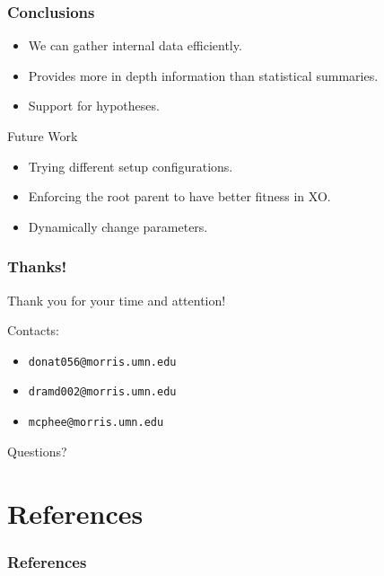 \documentclass{beamer}
\newcommand{\linespace}{\vskip 0.25cm}
\begin{document}
\begin{frame}
\frametitle{Conclusions}

\begin{itemize}
\item We can gather internal data efficiently.
\item Provides more in depth information than statistical summaries. 
\item Support for hypotheses.
\end{itemize}
\linespace
\linespace
\linespace
\linespace

Future Work
\begin{itemize}
\item Trying different setup configurations.
\item Enforcing the root parent to have better fitness in XO.
\item Dynamically change parameters.
\end{itemize}
\end{frame}

\begin{frame}
	\frametitle{Thanks!}
	
	Thank you for your time and attention!
		
	\linespace
	\linespace
	
	Contacts:  
	\begin{itemize}
		\item \texttt{donat056@morris.umn.edu}
		\item \texttt{dramd002@morris.umn.edu}
		\item \texttt{mcphee@morris.umn.edu}
	\end{itemize}
	
	\linespace
	\linespace
	
	\begin{center}
	{\huge Questions?}
	\end{center}
\end{frame}

\section*{References}

\begin{frame} 
\frametitle{References}
\nocite{*}

{\tiny }
\end{frame} 
\end{document}
